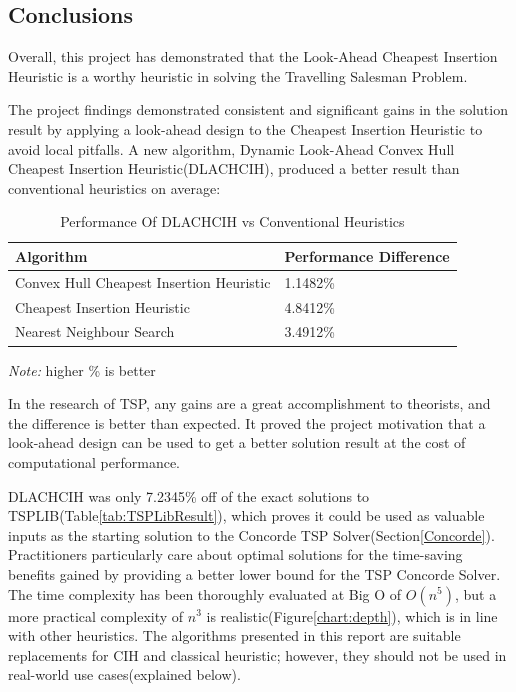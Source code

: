\begin{center}
\section{Conclusions}
\label{conc:aims}
\end{center}

Overall, this project has demonstrated that the Look-Ahead Cheapest Insertion Heuristic is a worthy heuristic in solving the Travelling Salesman Problem.

The project findings demonstrated consistent and significant gains in the solution result by applying a look-ahead design to the Cheapest Insertion Heuristic to avoid local pitfalls. A new algorithm, Dynamic Look-Ahead Convex Hull Cheapest Insertion Heuristic(DLACHCIH), produced a better result than conventional heuristics on average:

\begin{table}[H]
\centering
\begin{threeparttable}
\begin{tabular}{|l|l|}
\hline
\rowcolor[HTML]{EFEFEF} 
\textbf{Algorithm}                       & \textbf{Performance Difference} \\ \hline
Convex Hull Cheapest Insertion Heuristic & 1.1482\%                        \\ \hline
Cheapest Insertion Heuristic             & 4.8412\%                        \\ \hline
Nearest Neighbour Search                 & 3.4912\%                        \\ \hline
\end{tabular}
\begin{tablenotes}[flushleft]
\small
\item \textit{Note:} higher \% is better
\end{tablenotes}
\caption{Performance Of DLACHCIH vs Conventional Heuristics}
\end{threeparttable}
\end{table}

In the research of TSP, any gains are a great accomplishment to theorists, and the difference is better than expected. It proved the project motivation that a look-ahead design can be used to get a better solution result at the cost of computational performance.

DLACHCIH was only 7.2345\% off of the exact solutions to TSPLIB(Table\ref{tab:TSPLibResult}), which proves it could be used as valuable inputs as the starting solution to the Concorde TSP Solver(Section\ref{Concorde}). Practitioners particularly care about optimal solutions for the time-saving benefits gained by providing a better lower bound for the TSP Concorde Solver. The time complexity has been thoroughly evaluated at Big O of $O(n^5)$, but a more practical complexity of $n^3$ is realistic(Figure\ref{chart:depth}), which is in line with other heuristics. The algorithms presented in this report are suitable replacements for CIH and classical heuristic; however, they should not be used in real-world use cases(explained below).

